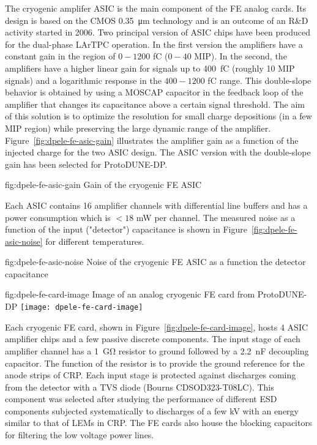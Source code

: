 The cryogenic amplifer ASIC is the main component of the FE analog cards. Its design is based on the CMOS \SI{0.35}{\micro\meter} technology and is an outcome of an R\&D  activity started in 2006. Two principal version of ASIC chips have been produced for the dual-phase LArTPC operation. In the first version the amplifiers have a constant gain in the region of $0-1200$ \si{\femto\coulomb} ($0-40$ MIP). In the second, the amplifiers have a higher linear gain for signals up to \SI{400}{\femto\coulomb} (roughly 10 MIP signals) and a logarithmic response in the  $400-1200$ \si{\femto\coulomb} range. This double-slope behavior is obtained by using a MOSCAP capacitor in the feedback loop of the amplifier that changes its capacitance above a certain signal threshold. The aim of this solution is to optimize the resolution for small charge depositions (in a few MIP region) while preserving the large dynamic range of the amplifier. Figure~\ref{fig:dpele-fe-asic-gain} illustrates the amplifier gain as a function of the injected charge for the two ASIC design. The ASIC version with the double-slope gain has been selected for ProtoDUNE-DP. 

\begin{dunefigure}{fig:dpele-fe-asic-gain}
{Gain of the cryogenic FE ASIC}
\end{dunefigure}

Each ASIC contains 16 amplifier channels with differential line buffers and has a power consumption which is $<18$ mW per channel. The measured noise as a function of the input ("detector")  capacitance is shown in Figure~\ref{fig:dpele-fe-asic-noise} for different temperatures.  

\begin{dunefigure}{fig:dpele-fe-asic-noise}
{Noise of the cryogenic FE ASIC as a function the detector capacitance}
\end{dunefigure}

\begin{dunefigure}{fig:dpele-fe-card-image}
{Image of an analog cryogenic FE card from ProtoDUNE-DP}
\texttt{[image: dpele-fe-card-image]}
\end{dunefigure}

Each cryogenic FE card, shown in Figure~\ref{fig:dpele-fe-card-image}, hosts 4 ASIC amplifier chips and a few passive discrete components. The input stage of each amplifier channel has a \SI{1}{\giga\ohm} resistor to ground followed by a \SI{2.2}{\nano\farad} decoupling capacitor. The function of the resistor is to provide the ground reference for the anode strips of CRP. Each input stage is protected against discharges coming from the detector with a TVS diode (Bourns CDSOD323-T08LC). This component was selected after studying the performance of different ESD components subjected systematically to discharges of a few kV with an energy similar to that of LEMs in CRP. The FE cards also house the blocking capacitors for filtering the low voltage power lines.

